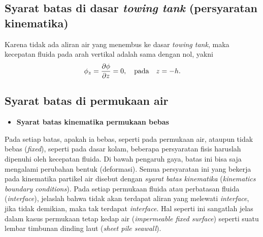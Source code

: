 \documentclass[12pt,a4paper]{report}
\begin{document}
\subsection{Syarat batas di dasar \textit{towing tank} (persyaratan
kinematika)}

Karena tidak ada aliran air yang menembus ke dasar \textit{towing tank},
maka kecepatan fluida pada arah vertikal adalah sama dengan nol, yakni
\begin{equation}
\phi_{z} = \frac{\partial\phi}{\partial z} = 0, \quad
\textmd{pada} \quad z = -h.
\end{equation}

\subsection{Syarat batas di permukaan air}

\begin{itemize}
\item  \textbf{Syarat batas kinematika permukaan bebas}
\end{itemize}

Pada setiap batas, apakah ia bebas, seperti pada permukaan air,
ataupun tidak bebas (\textit{fixed}), seperti pada dasar kolam,
beberapa persyaratan fisis haruslah dipenuhi oleh kecepatan
fluida. Di bawah pengaruh gaya, batas ini bisa saja mengalami
perubahan bentuk (deformasi). Semua persyaratan ini yang bekerja
pada kinematika partikel air disebut dengan \textit{syarat batas
kinematika} (\textit{kinematics boundary conditions}). Pada setiap
permukaan fluida atau perbatasan fluida (\textit{interface}),
jelaslah bahwa tidak akan terdapat aliran yang melewati
\textit{interface}, jika tidak demikian, maka tak terdapat
\textit{interface}. Hal seperti ini sangatlah jelas dalam kasus
permukaan tetap kedap air (\textit{impermeable fixed surface})
seperti suatu lembar timbunan dinding laut (\textit{sheet pile
seawall}).\cite{drg}
\end{document}
